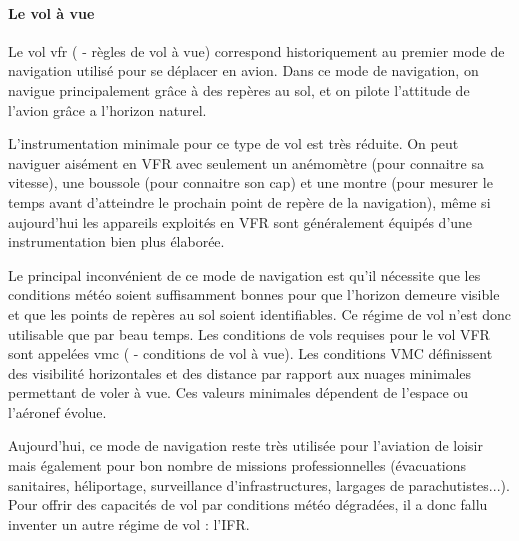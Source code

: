 		\paragraph{Le vol à vue}
		Le vol \acrshort{vfr} ( - règles de vol à vue) correspond historiquement au premier mode de navigation utilisé pour se déplacer en avion. Dans ce mode de navigation, on navigue principalement grâce à des repères au sol, et on pilote l'attitude de l'avion grâce a l'horizon naturel. 
		
		L'instrumentation minimale pour ce type de vol est très réduite. On peut naviguer aisément en VFR avec seulement un anémomètre (pour connaitre sa vitesse), une boussole (pour connaitre son cap) et une montre (pour mesurer le temps avant d'atteindre le prochain point de repère de la navigation), même si aujourd'hui les appareils exploités en VFR sont généralement équipés d'une instrumentation bien plus élaborée.
		
		
		Le principal inconvénient de ce mode de navigation est qu'il nécessite que les conditions météo soient suffisamment bonnes pour que l'horizon demeure visible et que les points de repères au sol soient identifiables. Ce régime de vol n'est donc utilisable que par beau temps. Les conditions de vols requises pour le vol VFR sont appelées \acrshort{vmc} ( - conditions de vol à vue). Les conditions VMC définissent des visibilité horizontales et des distance par rapport aux nuages minimales permettant de voler à vue. Ces valeurs minimales dépendent de l'espace ou l'aéronef évolue.
		
		
		
		Aujourd'hui, ce mode de navigation reste très utilisée pour l'aviation de loisir mais également pour bon nombre de missions professionnelles (évacuations sanitaires, héliportage, surveillance d'infrastructures, largages de parachutistes...). \\
		
		Pour offrir des capacités de vol par conditions météo dégradées, il a donc fallu inventer un autre régime de vol : l'IFR.
		
